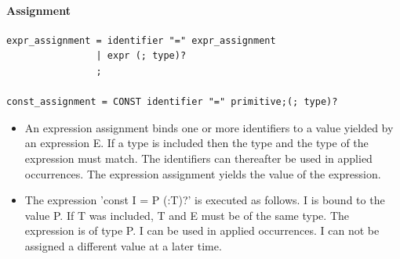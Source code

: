 \documentclass[paper=a4, fontsize=11pt]{article}
\numberwithin{equation}{section}		%
\numberwithin{figure}{section}			%
\numberwithin{table}{section}				%
\begin{document}
\paragraph{Assignment}
\begin{verbatim}
expr_assignment = identifier "=" expr_assignment
				| expr (; type)?
				;

const_assignment = CONST identifier "=" primitive;(; type)?
\end{verbatim}

\begin{itemize}
\item An expression assignment binds one or more identifiers to a value yielded by an expression E. If a type is included then the type and the type of the expression must match. The identifiers can thereafter be used in applied occurrences. The expression assignment yields the value of the expression.
\item The expression 'const I = P (:T)?' is executed as follows. I is bound to the value P. If T was included, T and E must be of the same type. The expression is of type P. I can be used in applied occurrences. I can not be assigned a different value at a later time.
\end{itemize}
\end{document}
